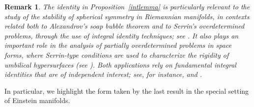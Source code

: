 \documentclass[reqno,11pt]{amsart}
\numberwithin{equation}{section}  %
\newtheorem{remark}[theorem]{Remark}
\begin{document}
\begin{remark}\label{remark_main}
The identity in Proposition~\ref{intlemma} is particularly relevant to the study of the stability of spherical symmetry in Riemannian manifolds, in contexts related both to Alexandrov's soap bubble theorem and to Serrin's overdetermined problems, through the use of integral identity techniques; see \cite{poggesi1, poggesi, OO21, SZ25}. It also plays an important role in the analysis of partially overdetermined problems in space forms, where Serrin-type conditions are used to characterize the rigidity of umbilical hypersurfaces (see \cite{guoxia1, guoxia2}). Both applications rely on fundamental integral identities that are of independent interest; see, for instance, \cite[Theorem 2.1]{poggesi} and \cite[Lemma 4.2]{xie2025}.    
\end{remark}

In particular, we highlight the form taken by the last result in the special setting of Einstein manifolds.
\end{document}
